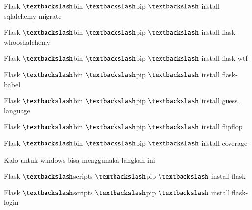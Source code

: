 \documentclass[a4paper,12pt]{report}
\begin{document}
\vspace{14pt}
\noindent 
{\fontsize{14pt}{14pt}\selectfont Flask $  \textbackslash  $bin $  \textbackslash  $pip $  \textbackslash  $ install sqlalchemy-migrate \\} \par
\vspace{14pt}
\noindent 
{\fontsize{14pt}{14pt}\selectfont Flask $  \textbackslash  $bin $  \textbackslash  $pip $  \textbackslash  $ install flask-whooshalchemy \\} \par
\vspace{14pt}
\noindent 
{\fontsize{14pt}{14pt}\selectfont Flask $  \textbackslash  $bin $  \textbackslash  $pip $  \textbackslash  $ install flask-wtf \\} \par
\vspace{14pt}
\noindent 
{\fontsize{14pt}{14pt}\selectfont Flask $  \textbackslash  $bin $  \textbackslash  $pip $  \textbackslash  $ install flask-babel \\} \par
\vspace{14pt}
\noindent 
{\fontsize{14pt}{14pt}\selectfont Flask $  \textbackslash  $bin $  \textbackslash  $pip $  \textbackslash  $ install guess $  \_  $language \\} \par
\vspace{14pt}
\noindent 
{\fontsize{14pt}{14pt}\selectfont Flask $  \textbackslash  $bin $  \textbackslash  $pip $  \textbackslash  $ install flipflop \\} \par
\vspace{14pt}
\noindent 
{\fontsize{14pt}{14pt}\selectfont Flask $  \textbackslash  $bin $  \textbackslash  $pip $  \textbackslash  $ install coverage \\} \par
\vspace{14pt}
\noindent 
{\fontsize{14pt}{14pt}\selectfont Kalo untuk windows bisa menggunaka langkah ini \\} \par
\vspace{14pt}
\noindent 
{\fontsize{14pt}{14pt}\selectfont Flask $  \textbackslash  $scripts $  \textbackslash  $pip $  \textbackslash  $ install flask \\} \par
\vspace{14pt}
\noindent 
{\fontsize{14pt}{14pt}\selectfont Flask $  \textbackslash  $scripts $  \textbackslash  $pip $  \textbackslash  $ install flask-login \\} \par
\end{document}

